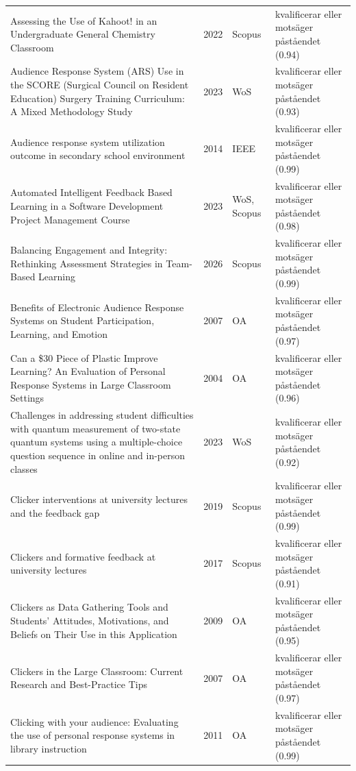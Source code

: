 \begin{longtable}{@{}%
  >{\raggedright\arraybackslash}p{}c%
  >{\raggedright\arraybackslash}p{}%
  >{\raggedright\arraybackslash}p{}@{}}
Assessing the Use of Kahoot! in an Undergraduate General Chemistry Classroom & 2022 & Scopus & kvalificerar eller motsäger påståendet (0.94) \\
Audience Response System (ARS) Use in the SCORE (Surgical Council on Resident Education) Surgery Training Curriculum: A Mixed Methodology Study & 2023 & WoS & kvalificerar eller motsäger påståendet (0.93) \\
Audience response system utilization outcome in secondary school environment & 2014 & IEEE & kvalificerar eller motsäger påståendet (0.99) \\
Automated Intelligent Feedback Based Learning in a Software Development Project Management Course & 2023 & WoS, Scopus & kvalificerar eller motsäger påståendet (0.98) \\
Balancing Engagement and Integrity: Rethinking Assessment Strategies in Team-Based Learning & 2026 & Scopus & kvalificerar eller motsäger påståendet (0.99) \\
Benefits of Electronic Audience Response Systems on Student Participation, Learning, and Emotion & 2007 & OA & kvalificerar eller motsäger påståendet (0.97) \\
Can a \$30 Piece of Plastic Improve Learning? An Evaluation of Personal Response Systems in Large Classroom Settings & 2004 & OA & kvalificerar eller motsäger påståendet (0.96) \\
Challenges in addressing student difficulties with quantum measurement of two-state quantum systems using a multiple-choice question sequence in online and in-person classes & 2023 & WoS & kvalificerar eller motsäger påståendet (0.92) \\
Clicker interventions at university lectures and the feedback gap & 2019 & Scopus & kvalificerar eller motsäger påståendet (0.99) \\
Clickers and formative feedback at university lectures & 2017 & Scopus & kvalificerar eller motsäger påståendet (0.91) \\
Clickers as Data Gathering Tools and Students' Attitudes, Motivations, and Beliefs on Their Use in this Application & 2009 & OA & kvalificerar eller motsäger påståendet (0.95) \\
Clickers in the Large Classroom: Current Research and Best-Practice Tips & 2007 & OA & kvalificerar eller motsäger påståendet (0.97) \\
Clicking with your audience: Evaluating the use of personal response systems in library instruction & 2011 & OA & kvalificerar eller motsäger påståendet (0.99) \\

\end{longtable}
